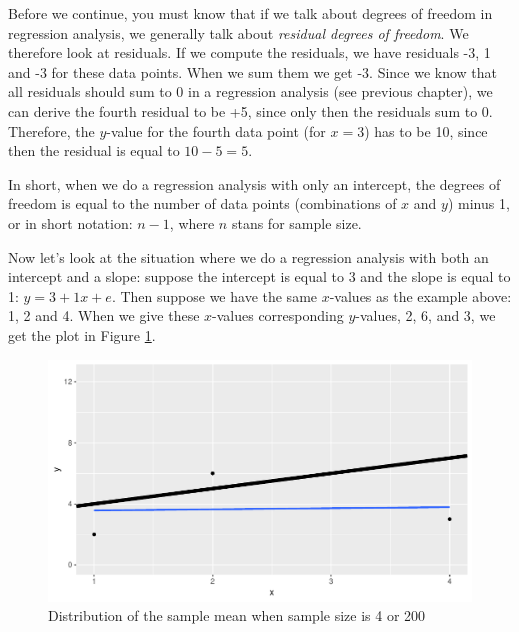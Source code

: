 \documentclass[]{book}\usepackage[]{graphicx}\usepackage[]{color}
\makeatletter
\def\maxwidth{ %
  \ifdim\Gin@nat@width>\linewidth
    \linewidth
  \else
    \Gin@nat@width
  \fi
}
\newenvironment{knitrout}{}{} %
\makeatother
\begin{document}
Before we continue, you must know that if we talk about degrees of freedom in regression analysis, we generally talk about \textit{residual degrees of freedom}. We therefore look at residuals. If we compute the residuals, we have residuals -3, 1 and -3 for these data points. When we sum them we get -3. Since we know that all residuals should sum to 0 in a regression analysis (see previous chapter), we can derive the fourth residual to be +5, since only then the residuals sum to 0. Therefore, the $y$-value for the fourth data point (for $x=3$) has to be 10, since then the residual is equal to $10-5=5$.

In short, when we do a regression analysis with only an intercept, the degrees of freedom is equal to the number of data points (combinations of $x$ and $y$) minus 1, or in short notation: $n-1$, where $n$ stans for sample size.

Now let's look at the situation where we do a regression analysis with both an intercept and a slope: suppose the intercept is equal to 3 and the slope is equal to 1: $y=3+1 x+e$. Then suppose we have the same $x$-values as the example above: 1, 2 and 4. When we give these $x$-values corresponding $y$-values, 2, 6, and 3, we get the plot in Figure \ref{fig:inf_12}.

\begin{knitrout}
\color{fgcolor}\begin{figure}

{\centering \includegraphics[width=\maxwidth]{figure/inf_12-1} 

}

\caption[Distribution of the sample mean when sample size is 4 or 200]{Distribution of the sample mean when sample size is 4 or 200}\label{fig:inf_12}
\end{figure}


\end{knitrout}
\end{document}
